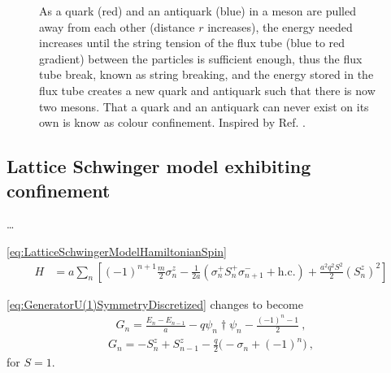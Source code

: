 \documentclass[../main.tex]{subfiles} %
\begin{document}
\begin{figure}[t]
    \caption{As a quark (red) and an antiquark (blue) in a meson are pulled away from each other (distance $r$ increases), the energy needed increases until the string tension of the flux tube (blue to red gradient) between the particles is sufficient enough, thus the flux tube break, known as string breaking, and the energy stored in the flux tube creates a new quark and antiquark such that there is now two mesons. That a quark and an antiquark can never exist on its own is know as colour confinement. Inspired by Ref. \cite{institutoDeFisicaCorpuscular_numericalApproach_2016}.}
    \label{fig:QuarkConfinement}
\end{figure}




\subsection{Lattice Schwinger model exhibiting confinement} \label{sec:qIsChangeShowed}

\ldots

\cref{eq:LatticeSchwingerModelHamiltonianSpin}
\begin{align}
    H &= a \sum_n \left[ (-1)^{n+1} \frac{m}{2} \sigma_n^z - \frac{1}{2a} \left( \sigma_n^+ S_n^+ \sigma_{n+1}^- + \mathrm{h.c.} \right) + \frac{a^2 q^2 S^2}{2} \left( S_n^z \right)^2 \right]
\end{align}

\cref{eq:GeneratorU(1)SymmetryDiscretized} changes to become
\begin{align}
    G_n = \frac{E_n - E_{n-1}}{a} - q \psi_n\dagger \psi_n - \frac{(-1)^n - 1}{2} \: ,
\end{align}
\begin{align} \label{eq:GeneratorU(1)Symmetry}
    G_n = - S_n^z + S_{n-1}^z - \frac{q}{2} \big( - \sigma_n + (-1)^n \big) \: ,
\end{align}
for $S=1$. \cite{buyens_confinementAndStringBreaking_2016}
\end{document}
